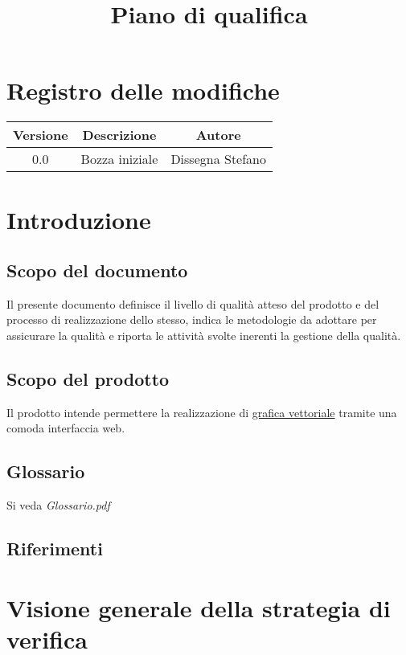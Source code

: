 \documentclass[a4paper]{article}
\begin{document}
\title{Piano di qualifica}

\section{Registro delle modifiche}
\begin{tabular}{|c|c|c|}
\hline
Versione & Descrizione & Autore \\ \hline 
0.0 & Bozza iniziale & Dissegna Stefano \\ \hline 
\end{tabular} 

\section{Introduzione}

\subsection{Scopo del documento}
Il presente documento definisce il livello di qualit\`a atteso del prodotto e del processo di realizzazione dello stesso, indica le metodologie da adottare per assicurare la qualit\`a e riporta le attivit\`a svolte inerenti la gestione della qualit\`a.

\subsection{Scopo del prodotto}
Il prodotto intende permettere la realizzazione di \underline{grafica vettoriale} tramite una comoda interfaccia web.

\subsection{Glossario}
Si veda \textit{Glossario.pdf}

\subsection{Riferimenti}

\section{Visione generale della strategia di verifica}
\end{document}
